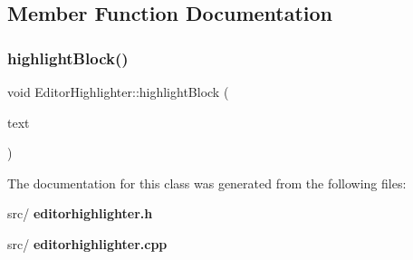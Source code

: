 \subsection{Member Function Documentation}
\mbox{\label{class_editor_highlighter_a78b64f41ec396f40a6f48e9f939f809e}} 
\subsubsection{highlight\+Block()}
{\footnotesize\ttfamily void Editor\+Highlighter\+::highlight\+Block (\begin{DoxyParamCaption}\item[{const Q\+String \&}]{text }\end{DoxyParamCaption})}



The documentation for this class was generated from the following files\+:\begin{DoxyCompactItemize}
\item 
src/\textbf{ editorhighlighter.\+h}\item 
src/\textbf{ editorhighlighter.\+cpp}\end{DoxyCompactItemize}
